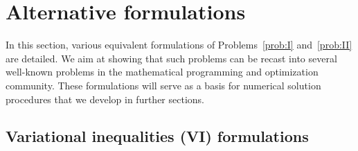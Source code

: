 








\clearpage
\section{Alternative formulations}
\label{sec:formulation}
In this section, various equivalent formulations of Problems~\ref{prob:I} and~\ref{prob:II} are detailed. We aim at showing that such problems can be recast into several well-known problems in the mathematical programming and optimization community. These formulations will serve as a basis for  numerical solution procedures that we develop in further sections.

\subsection{Variational inequalities (VI) formulations}

